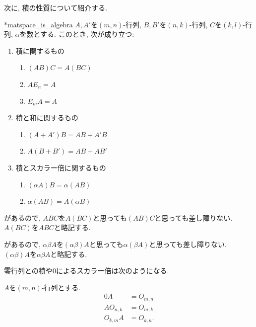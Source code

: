 次に, 積の性質について紹介する.
\begin{prop}
  \provelater**{matspace_is_algebra}
  $A,A'$を$(m,n)$-行列,
  $B,B'$を$(n,k)$-行列,
  $C$を$(k,l)$-行列,
  $\alpha$を数とする.
  このとき, 次が成り立つ:
  \begin{enumerate}
  \item 積に関するもの
    \begin{enumerate}
    \item {}
      \label{item:prod:c}
      $(AB)C=A(BC)$
    \item {}
      $AE_n=A$
    \item {}
      $E_m A=A$
    \end{enumerate}
  \item 積と和に関するもの
    \begin{enumerate}      
    \item {}
      $(A+A')B=AB+A'B$
    \item {}
      $A(B+B')=AB+AB'$
    \end{enumerate}
  \item 積とスカラー倍に関するもの
    \begin{enumerate}      
    \item
      \label{item:act:c}
      $(\alpha A)B=\alpha(AB)$
    \item
      $\alpha (AB)=A(\alpha B)$
    \end{enumerate}
  \end{enumerate}
\end{prop}

\begin{remark}
  があるので,
  $ABC$を$A(BC)$と思っても$(AB)C$と思っても差し障りない.
  $A(BC)$を$ABC$と略記する.
\end{remark}
\begin{remark}
  があるので,
  $\alpha \beta A$を$(\alpha \beta) A$と思っても$\alpha (\beta A)$と思っても差し障りない.
  $(\alpha \beta) A$を$\alpha \beta A$と略記する.
\end{remark}

零行列との積や$0$によるスカラー倍は次のようになる.
\begin{prop}
  $A$を$(m,n)$-行列とする.
  \begin{align*}
    0A&=O_{m,n}\\
    A O_{n,k}&=O_{m,k}\\
    O_{k,m} A&=O_{k,n}.
  \end{align*}
\end{prop}

